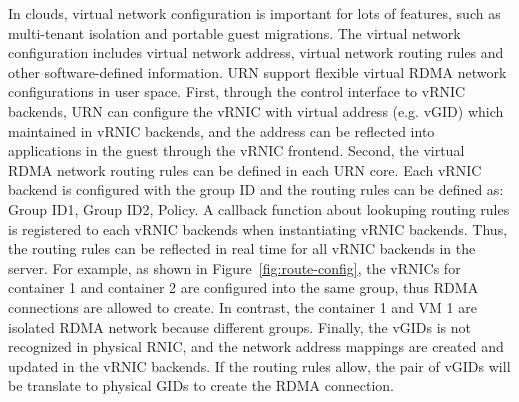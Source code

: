 In clouds, virtual network configuration is important for lots of features, such as multi-tenant isolation and portable guest migrations. The virtual network configuration includes virtual network address, virtual network routing rules and other software-defined information. URN support flexible virtual RDMA network configurations in user space. 
First, through the control interface to vRNIC backends, URN can configure the vRNIC with virtual address (e.g. vGID) which maintained in vRNIC backends, and the address can be reflected into applications in the guest through the vRNIC frontend.
Second, the virtual RDMA network routing rules can be defined in each URN core. Each vRNIC backend is configured with the group ID and the routing rules can be defined as: {Group ID1, Group ID2, Policy}. A callback function about lookuping routing rules is registered to each vRNIC backends when instantiating vRNIC backends. Thus, the routing rules can be reflected in real time for all vRNIC backends in the server. For example, as shown in Figure~\ref{fig:route-config}, the vRNICs for container 1 and container 2 are configured into the same group, thus RDMA connections are allowed to create. In contrast, the container 1 and VM 1 are isolated RDMA network because different groups. Finally, the vGIDs is not recognized in physical RNIC, and the network address mappings are created and updated in the vRNIC backends. If the routing rules allow, the pair of vGIDs will be translate to physical GIDs to create the RDMA connection.

